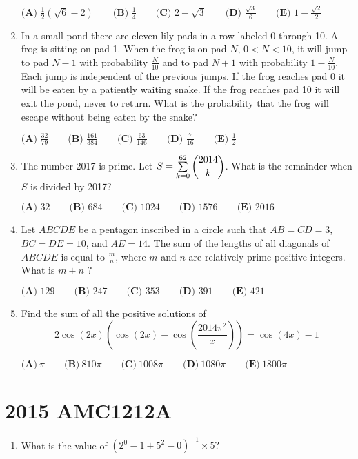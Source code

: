 \documentclass{article}
\begin{document}
\begin{enumerate}[label=\arabic*., itemsep=0.5em]
$ \textbf{(A) }\frac{1}{2}(\sqrt{6}-2)\qquad\textbf{(B) }\frac{1}{4}\qquad\textbf{(C) }2-\sqrt{3}\qquad\textbf{(D) }\frac{\sqrt{3}}{6}\qquad\textbf{(E) } 1-\frac{\sqrt{2}}{2}$\par \vspace{0.5em}\item In a small pond there are eleven lily pads in a row labeled 0 through 10.  A frog is sitting on pad 1.  When the frog is on pad $N$, $0<N<10$, it will jump to pad $N-1$ with probability $\frac{N}{10}$ and to pad $N+1$ with probability $1-\frac{N}{10}$.  Each jump is independent of the previous jumps.  If the frog reaches pad 0 it will be eaten by a patiently waiting snake.  If the frog reaches pad 10 it will exit the pond, never to return.  What is the probability that the frog will escape without being eaten by the snake?

$\textbf{(A) }\frac{32}{79}\qquad
\textbf{(B) }\frac{161}{384}\qquad
\textbf{(C) }\frac{63}{146}\qquad
\textbf{(D) }\frac{7}{16}\qquad
\textbf{(E) }\frac{1}{2}\qquad$\par \vspace{0.5em}\item The number 2017 is prime.  Let $S = \sum \limits_{k=0}^{62} \dbinom{2014}{k}$.  What is the remainder when $S$ is divided by 2017?

$\textbf{(A) }32\qquad
\textbf{(B) }684\qquad
\textbf{(C) }1024\qquad
\textbf{(D) }1576\qquad
\textbf{(E) }2016\qquad$\par \vspace{0.5em}\item Let $ABCDE$ be a pentagon inscribed in a circle such that $AB = CD = 3$, $BC = DE = 10$, and $AE= 14$.  The sum of the lengths of all diagonals of $ABCDE$ is equal to $\frac{m}{n}$, where $m$ and $n$ are relatively prime positive integers.  What is $m+n$ ?

$\textbf{(A) }129\qquad
\textbf{(B) }247\qquad
\textbf{(C) }353\qquad
\textbf{(D) }391\qquad
\textbf{(E) }421\qquad$\par \vspace{0.5em}\item Find the sum of all the positive solutions of 
\begin{equation*}
2\cos(2x) \left(\cos(2x) - \cos\left( \frac{2014\pi^2}{x} \right)\right) = \cos(4x) - 1
\end{equation*}


$ \textbf{(A)}\ \pi \qquad\textbf{(B)}\ 810\pi  \qquad\textbf{(C)}\ 1008\pi \qquad\textbf{(D)}\ 1080 \pi \qquad\textbf{(E)}\ 1800\pi $\par \vspace{0.5em}\end{enumerate}\newpage\section*{2015 AMC1212A}\begin{enumerate}[label=\arabic*., itemsep=0.5em]\item What is the value of $(2^0-1+5^2-0)^{-1}\times5?$


\end{enumerate}
\end{document}
